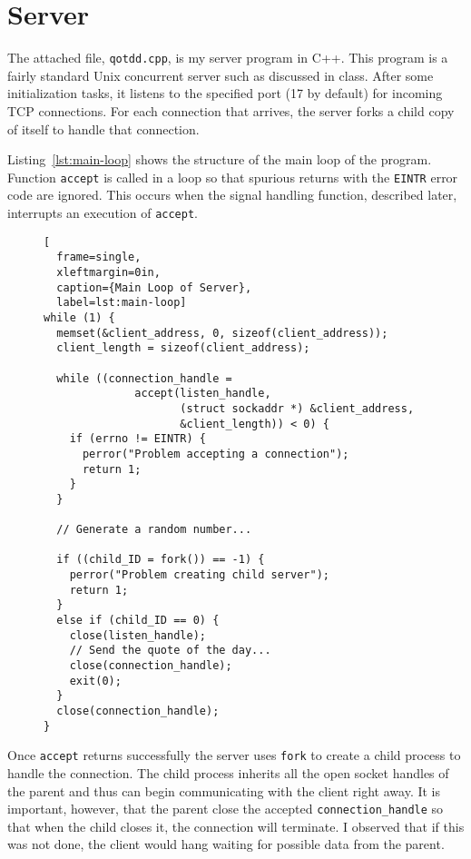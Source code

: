\documentclass{article}
\newcommand{\filename}[1]{\texttt{#1}}
\newcommand{\code}[1]{\texttt{#1}}
\begin{document}
\section{Server}
\label{sec:server}

The attached file, \filename{qotdd.cpp}, is my server program in C++. This program is a fairly
standard Unix concurrent server such as discussed in class. After some initialization tasks, it
listens to the specified port (17 by default) for incoming TCP connections. For each connection
that arrives, the server forks a child copy of itself to handle that connection.

Listing~\ref{lst:main-loop} shows the structure of the main loop of the program. Function
\code{accept} is called in a loop so that spurious returns with the \code{EINTR} error code are
ignored. This occurs when the signal handling function, described later, interrupts an execution
of \code{accept}.

\begin{figure}[tbhp]
\begin{lstlisting}[
  frame=single,
  xleftmargin=0in,
  caption={Main Loop of Server},
  label=lst:main-loop]
while (1) {
  memset(&client_address, 0, sizeof(client_address));
  client_length = sizeof(client_address);

  while ((connection_handle =
              accept(listen_handle,
                     (struct sockaddr *) &client_address,
                     &client_length)) < 0) {
    if (errno != EINTR) {
      perror("Problem accepting a connection");
      return 1;
    }
  }

  // Generate a random number...

  if ((child_ID = fork()) == -1) {
    perror("Problem creating child server");
    return 1;
  }
  else if (child_ID == 0) {
    close(listen_handle);
    // Send the quote of the day...
    close(connection_handle);
    exit(0);
  }
  close(connection_handle);
}
\end{lstlisting}    
\end{figure}

Once \code{accept} returns successfully the server uses \code{fork} to create a child process to
handle the connection. The child process inherits all the open socket handles of the parent and
thus can begin communicating with the client right away. It is important, however, that the
parent close the accepted \code{connection\_handle} so that when the child closes it, the
connection will terminate. I observed that if this was not done, the client would hang waiting
for possible data from the parent.
\end{document}
